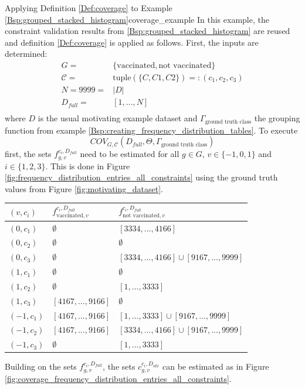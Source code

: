 \begin{Bsp}{Applying Definition \ref{Def:coverage} to Example \ref{Bsp:grouped_stacked_histogram}}{coverage_example}
In this example, the constraint validation results from \ref{Bsp:grouped_stacked_histogram} are reused and definition \ref{Def:coverage} is applied as follows.
First, the inputs are determined:
\begin{align*}
    G = & \{\text{vaccinated}, \text{not vaccinated}\} \\
    \mathcal{C} = & \text{tuple}(\{C,C1,C2\}) =: (c_1,c_2,c_3) \\
    N = 9999 = & |D| \\
    D_{full} = & [1,...,N] \\
\end{align*}
where $D$ is the usual motivating example dataset and $\Gamma_{\textrm{ground truth class}}$ the grouping function from example \ref{Bsp:creating_frequency_distribution_tables}.
To execute \[COV_{G,\mathcal{C}}(D_{full},\Theta,\Gamma_{\textrm{ground truth class}})\] first, the sets $f_{g,v}^{c_i,D_{full}}$ need to be estimated for all $g \in G$, $v \in \{-1,0,1\}$ and $i \in \{1,2,3\}$. This is done in Figure \ref{fig:frequency_distribution_entries_all_constraints} using the ground truth values from Figure \ref{fig:motivating_dataset}.

\captionsetup{type=htypei}
\begin{minipage}[t]{\linewidth}
    \vspace{1ex}
    \centering
    \begin{tabular}{l|ll}
        \toprule
        $(v,c_i)$ & $f_{\text{vaccinated},v}^{c_i,D_{full}}$ & $f_{\text{not vaccinated},v}^{c_i,D_{full}}$\\
        \midrule
        \midrule
        $(0,c_1)$ & $\emptyset$ & $[3334,...,4166]$ \\
        $(0,c_2)$ & $\emptyset$ & $\emptyset$\\
        $(0,c_3)$ & $\emptyset$ & $[3334,...,4166] \cup [9167,...,9999]$\\
        $(1,c_1)$ & $\emptyset$ & $\emptyset$\\
        $(1,c_2)$ & $\emptyset$ & $[1,...,3333]$\\
        $(1,c_3)$ & $[4167,...,9166]$ & $\emptyset$\\
        $(-1,c_1)$ & $[4167,...,9166]$ & $[1,...,3333] \cup [9167,...,9999]$ \\
        $(-1,c_2)$ & $[4167,...,9166]$ & $[3334,...,4166] \cup [9167,...,9999]$ \\
        $(-1,c_3)$ & $\emptyset$ & $[1,...,3333]$ \\
        \bottomrule
    \end{tabular}
    \label{fig:frequency_distribution_entries_all_constraints}
    \vspace{1ex}
\end{minipage}
Building on the sets $f_{g,v}^{c_i,D_{full}}$, the sets $c_{g,v}^{c_i,D_{idx}}$ can be estimated as in Figure \ref{fig:coverage_frequency_distribution_entries_all_constraints}.


\end{Bsp}
